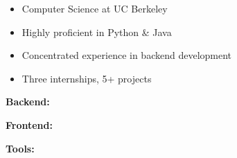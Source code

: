 \documentclass[10pt,a4paper,ragged2e,withhyper]{altacv}
\begin{document}
\begin{paracol}{2}









\switchcolumn



\begin{itemize}
    \item Computer Science at UC Berkeley
    \item Highly proficient in Python \& Java
    \item Concentrated experience in backend development
    \item Three internships, 5+ projects
\end{itemize}


\linebreak
{}

\medskip


\textbf{Backend:} 
\divider

\textbf{Frontend:}

\divider

\textbf{Tools:}


\end{paracol}
\end{document}
